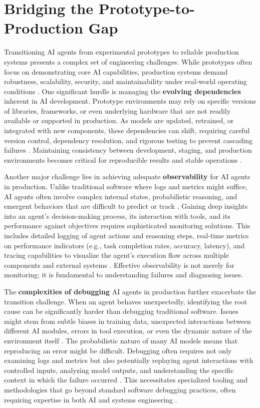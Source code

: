 \section{Bridging the Prototype-to-Production Gap}

Transitioning AI agents from experimental prototypes to reliable production systems presents a complex set of engineering challenges. While prototypes often focus on demonstrating core AI capabilities, production systems demand robustness, scalability, security, and maintainability under real-world operating conditions \cite{Reger2026}. One significant hurdle is managing the \textbf{evolving dependencies} inherent in AI development. Prototype environments may rely on specific versions of libraries, frameworks, or even underlying hardware that are not readily available or supported in production. As models are updated, retrained, or integrated with new components, these dependencies can shift, requiring careful version control, dependency resolution, and rigorous testing to prevent cascading failures \cite{Gartner2025}. Maintaining consistency between development, staging, and production environments becomes critical for reproducible results and stable operations \cite{Reger2026}.

Another major challenge lies in achieving adequate \textbf{observability} for AI agents in production. Unlike traditional software where logs and metrics might suffice, AI agents often involve complex internal states, probabilistic reasoning, and emergent behaviors that are difficult to predict or track \cite{Reger2026}. Gaining deep insights into an agent's decision-making process, its interaction with tools, and its performance against objectives requires sophisticated monitoring solutions. This includes detailed logging of agent actions and reasoning steps, real-time metrics on performance indicators (e.g., task completion rates, accuracy, latency), and tracing capabilities to visualize the agent's execution flow across multiple components and external systems \cite{Gartner2025}. Effective observability is not merely for monitoring; it is fundamental to understanding failures and diagnosing issues.

The \textbf{complexities of debugging} AI agents in production further exacerbate the transition challenge. When an agent behaves unexpectedly, identifying the root cause can be significantly harder than debugging traditional software. Issues might stem from subtle biases in training data, unexpected interactions between different AI modules, errors in tool execution, or even the dynamic nature of the environment itself \cite{Reger2026}. The probabilistic nature of many AI models means that reproducing an error might be difficult. Debugging often requires not only examining logs and metrics but also potentially replaying agent interactions with controlled inputs, analyzing model outputs, and understanding the specific context in which the failure occurred \cite{Gartner2025}. This necessitates specialized tooling and methodologies that go beyond standard software debugging practices, often requiring expertise in both AI and systems engineering \cite{Reger2026}.

